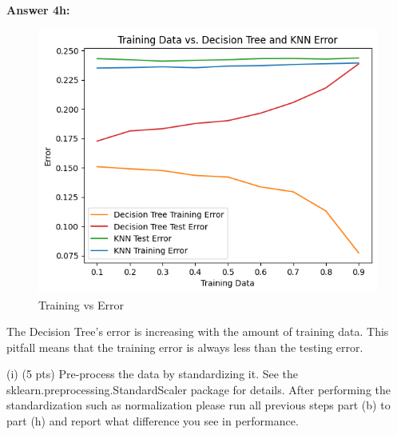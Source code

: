 \documentclass[10pt]{article}
\begin{document}
\hspace{1 cm}

\begin{flushleft}

\textbf{Answer 4h:}

\begin{figure}[H]
\centering
\includegraphics[width=1\textwidth]{images/training_error_vs.png}
\caption{Training vs Error}
\label{fig:Training}
\end{figure}

The Decision Tree's error is increasing with the amount of training data. This pitfall means that the training error is always less than the testing error.
    
\end{flushleft}

(i) (5 pts) Pre-process the data by standardizing it. See the sklearn.preprocessing.StandardScaler package for details. After performing the standardization such as normalization please run all previous steps part (b) to part (h) and report what difference you see in performance.

\hspace{1 cm}
\end{document}
